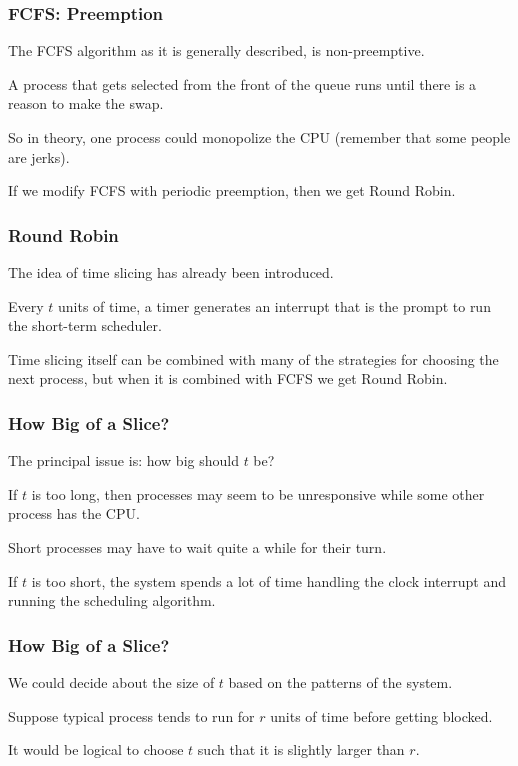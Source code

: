 \begin{frame}
\frametitle{FCFS: Preemption}

The FCFS algorithm as it is generally described, is non-preemptive.

A process that gets selected from the front of the queue runs until there is a reason to make the swap. 

So in theory, one process could monopolize the CPU (remember that some people are jerks). 

If we modify FCFS with periodic preemption, then we get Round Robin.

\end{frame}

\begin{frame}
\frametitle{Round Robin}

The idea of time slicing has already been introduced. 

Every $t$ units of time, a timer generates an interrupt that is the prompt to run the short-term scheduler. 

Time slicing itself can be combined with many of the strategies for choosing the next process, but when it is combined with FCFS we get Round Robin. 


\end{frame}

\begin{frame}
\frametitle{How Big of a Slice?}

The principal issue is: how big should $t$ be? 

If $t$ is too long, then processes may seem to be unresponsive while some other process has the CPU. 

Short processes may have to wait quite a while for their turn.

If $t$ is too short, the system spends a lot of time handling the clock interrupt and running the scheduling algorithm.


\end{frame}

\begin{frame}
\frametitle{How Big of a Slice?}

We could decide about the size of $t$ based on the patterns of the system. 

Suppose typical process tends to run for $r$ units of time before getting blocked.

It would be logical to choose $t$ such that it is slightly larger than $r$. 

\end{frame}


